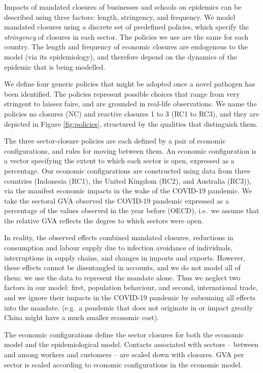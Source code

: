 \documentclass[
]{article}
\begin{document}
Impacts of mandated closures of businesses and schools on epidemics can be described using three factors: length, stringency, and frequency. We model mandated closures using a discrete set of predefined policies, which specify the \emph{stringency} of closures in each sector. The policies we use are the same for each country. The length and frequency of economic closures are endogenous to the model (via its epidemiology), and therefore depend on the dynamics of the epidemic that is being modelled.

We define four generic policies that might be adopted once a novel pathogen has been identified. The policies represent possible choices that range from very stringent to laissez faire, and are grounded in real-life observations. We name the policies no closures (NC) and reactive closures 1 to 3 (RC1 to RC3), and they are depicted in Figure \ref{fig:policies}, structured by the qualities that distinguish them.

The three sector-closure policies are each defined by a pair of economic configurations, and rules for moving between them. An economic configuration is a vector specifying the extent to which each sector is open, expressed as a percentage. Our economic configurations are constructed using data from three countries (Indonesia (RC1), the United Kingdom (RC2), and Australia (RC3)), via the manifest economic impacts in the wake of the COVID-19 pandemic. We take the sectoral GVA observed the COVID-19 pandemic expressed as a percentage of the values observed in the year before (OECD), i.e.~we assume that the relative GVA reflects the degree to which sectors were open.

In reality, the observed effects combined mandated closures, reductions in consumption and labour supply due to infection avoidance of individuals, interruptions in supply chains, and changes in imports and exports. However, these effects cannot be disentangled in accounts, and we do not model all of them: we use the data to represent the mandate alone. Thus we neglect two factors in our model: first, population behaviour, and second, international trade, and we ignore their impacts in the COVID-19 pandemic by subsuming all effects into the mandate. (e.g.~a pandemic that does not originate in or impact greatly China might have a much smaller economic cost).

The economic configurations define the sector closures for both the economic model and the epidemiological model. Contacts associated with sectors -- between and among workers and customers -- are scaled down with closures. GVA per sector is scaled according to economic configurations in the economic model.
\end{document}
